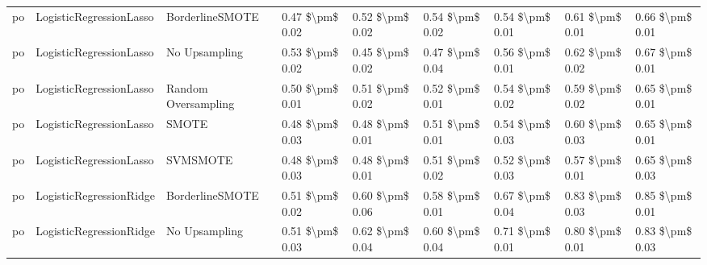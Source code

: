 \begin{tabular}{lllllllll}
      po &         LogisticRegressionLasso &               BorderlineSMOTE &     0.47 \$\textbackslash pm\$ 0.02 &           0.52 \$\textbackslash pm\$ 0.02 &       0.54 \$\textbackslash pm\$ 0.02 &        0.54 \$\textbackslash pm\$ 0.01 &                         0.61 \$\textbackslash pm\$ 0.01 &     0.66 \$\textbackslash pm\$ 0.01 \\
      po &         LogisticRegressionLasso &                 No Upsampling &     0.53 \$\textbackslash pm\$ 0.02 &           0.45 \$\textbackslash pm\$ 0.02 &       0.47 \$\textbackslash pm\$ 0.04 &        0.56 \$\textbackslash pm\$ 0.01 &                         0.62 \$\textbackslash pm\$ 0.02 &     0.67 \$\textbackslash pm\$ 0.01 \\
      po &         LogisticRegressionLasso &           Random Oversampling &     0.50 \$\textbackslash pm\$ 0.01 &           0.51 \$\textbackslash pm\$ 0.02 &       0.52 \$\textbackslash pm\$ 0.01 &        0.54 \$\textbackslash pm\$ 0.02 &                         0.59 \$\textbackslash pm\$ 0.02 &     0.65 \$\textbackslash pm\$ 0.01 \\
      po &         LogisticRegressionLasso &                         SMOTE &     0.48 \$\textbackslash pm\$ 0.03 &           0.48 \$\textbackslash pm\$ 0.01 &       0.51 \$\textbackslash pm\$ 0.01 &        0.54 \$\textbackslash pm\$ 0.03 &                         0.60 \$\textbackslash pm\$ 0.03 &     0.65 \$\textbackslash pm\$ 0.01 \\
      po &         LogisticRegressionLasso &                      SVMSMOTE &     0.48 \$\textbackslash pm\$ 0.03 &           0.48 \$\textbackslash pm\$ 0.01 &       0.51 \$\textbackslash pm\$ 0.02 &        0.52 \$\textbackslash pm\$ 0.03 &                         0.57 \$\textbackslash pm\$ 0.01 &     0.65 \$\textbackslash pm\$ 0.03 \\
      po &         LogisticRegressionRidge &               BorderlineSMOTE &     0.51 \$\textbackslash pm\$ 0.02 &           0.60 \$\textbackslash pm\$ 0.06 &       0.58 \$\textbackslash pm\$ 0.01 &        0.67 \$\textbackslash pm\$ 0.04 &                         0.83 \$\textbackslash pm\$ 0.03 &     0.85 \$\textbackslash pm\$ 0.01 \\
      po &         LogisticRegressionRidge &                 No Upsampling &     0.51 \$\textbackslash pm\$ 0.03 &           0.62 \$\textbackslash pm\$ 0.04 &       0.60 \$\textbackslash pm\$ 0.04 &        0.71 \$\textbackslash pm\$ 0.01 &                         0.80 \$\textbackslash pm\$ 0.01 &     0.83 \$\textbackslash pm\$ 0.03 \\

\end{tabular}

